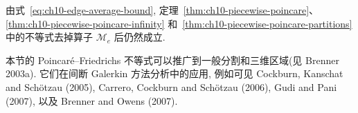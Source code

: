 \begin{Remark}
\label{rem:ch10-poincare-without-edge-average}
由式~\eqref{eq:ch10-edge-average-bound}, 定理~\ref{thm:ch10-piecewise-poincare}、\ref{thm:ch10-piecewise-poincare-infinity} 和~\ref{thm:ch10-piecewise-poincare-partitions} 中的不等式去掉算子 $\mathcal M_e$ 后仍然成立.
\end{Remark}

\begin{Remark}
\label{rem:ch10-poincare-general-partitions}
本节的 Poincaré--Friedrichs 不等式可以推广到一般分割和三维区域(见 Brenner 2003a). 它们在间断 Galerkin 方法分析中的应用, 例如可见 Cockburn, Kanschat and Schötzau (2005), Carrero, Cockburn and Schötzau (2006), Gudi and Pani (2007), 以及 Brenner and Owens (2007).
\end{Remark}
